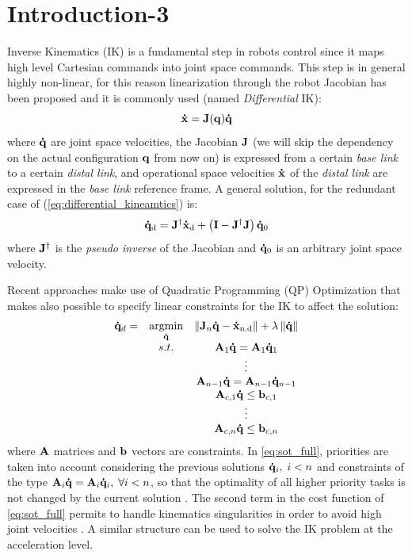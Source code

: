 
\section{Introduction-3}
\label{sec:introduction3}
Inverse Kinematics (IK) is a fundamental step in robots control since it maps high level Cartesian commands into joint space commands. This step is in general highly non-linear, for this reason linearization through the robot Jacobian has been proposed and it is commonly used (named \emph{Differential} IK):
\begin{equation}
    \label{eq:differential_kineamtics}
    \mathbf{\dot{x}} = \mathbf{J}(\mathbf{q})\mathbf{\dot{q}}
\end{equation}
where $\mathbf{\dot{q}}$ are joint space velocities, the Jacobian $\mathbf{J}$ (we will skip the dependency on the actual configuration $\mathbf{q}$ from now on) is expressed from a certain \emph{base link} to a certain \emph{distal link}, and operational space velocities $\mathbf{\dot{x}}$ of the \emph{distal link} are expressed in the \emph{base link} reference frame.
A general solution, for the redundant case of (\ref{eq:differential_kineamtics}) is:
\begin{equation}
    \label{eq:differential_inverse_kineamtics}
    \mathbf{\dot{q}}_\text{d} = \mathbf{J}^{\dagger}\mathbf{\dot{x}}_\text{d} + \left( \mathbf{I} - \mathbf{J}^{\dagger}\mathbf{J} \right)\mathbf{\dot{q}}_\text{0}
\end{equation}
where $\mathbf{J}^{\dagger}$ is the \emph{pseudo inverse} of the Jacobian and $\mathbf{\dot{q}}_\text{0}$ is an arbitrary joint space velocity. 

Recent approaches make use of Quadratic Programming (QP) Optimization that makes also possible to specify linear constraints for the IK to affect the solution:
\begin{equation}
\begin{array} {ccc}
    \mathbf{\dot{q}}_d  = & \underset{ \mathbf{\dot{q}} }{ \text{argmin} } & \left\| \mathbf{J}_n \mathbf{\dot{q}} - \mathbf{\dot{x}}_\text{n,d} \right\| + \lambda \left\| \mathbf{\dot{q}} \right\| \\
    & {s.t.} & \mathbf{A}_1 \mathbf{\dot{q}} = \mathbf{A}_1 \mathbf{\dot{q}}_1 \\
    & &  \vdots \\
    & & \mathbf{A}_{n-1} \mathbf{\dot{q}} = \mathbf{A}_{n-1} \mathbf{\dot{q}}_{n-1} \\
    & & \mathbf{A}_{c,1}\mathbf{\dot{q}} \leq \mathbf{b}_{c,1} \\
    & & \vdots \\
    & & \mathbf{A}_{c,n}\mathbf{\dot{q}} \leq \mathbf{b}_{c,n}
\end{array}
\label{eq:sot_full}
\end{equation}
where $\mathbf{A}$ matrices and $\mathbf{b}$ vectors are constraints.
In \eqref{eq:sot_full}, priorities are taken into account considering the previous solutions $\mathbf{\dot{q}}_i, \; i < n$ and constraints of the type {$\mathbf{A}_i \mathbf{\dot{q}} = \mathbf{A}_i \mathbf{\dot{q}}_i, \; \forall i < n$},  so that the optimality of all higher priority tasks is not changed by the current solution \cite{mansard2009-eq}. The second term in the cost function of \eqref{eq:sot_full} permits to handle kinematics singularities in order to avoid high joint velocities \cite{nakamura1990-tp}. A similar structure can be used to solve the IK problem at the acceleration level.

